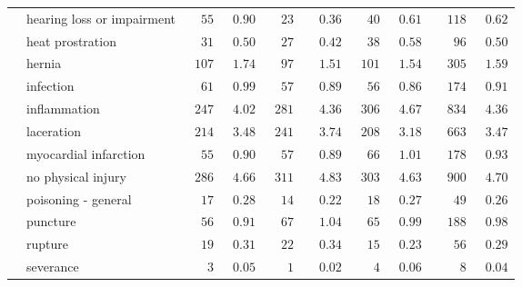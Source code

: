 \documentclass[9pt, oneside]{article}   	%
\begin{document}
\begin{longtable}{p{1.8in}p{2.2in}cccccccc}
 & hearing loss or impairment  & $\phantom{00}55$ & $\phantom{0}0.90$ & $\phantom{00}23$ & $\phantom{00}0.36$ & $\phantom{00}40$ & $\phantom{0}0.61$ & $\phantom{00}118$ & $\phantom{0}0.62$ \\
 & heat prostration  & $\phantom{00}31$ & $\phantom{0}0.50$ & $\phantom{00}27$ & $\phantom{00}0.42$ & $\phantom{00}38$ & $\phantom{0}0.58$ & $\phantom{000}96$ & $\phantom{0}0.50$ \\
 & hernia  & $\phantom{0}107$ & $\phantom{0}1.74$ & $\phantom{00}97$ & $\phantom{00}1.51$ & $\phantom{0}101$ & $\phantom{0}1.54$ & $\phantom{00}305$ & $\phantom{0}1.59$ \\
 & infection  & $\phantom{00}61$ & $\phantom{0}0.99$ & $\phantom{00}57$ & $\phantom{00}0.89$ & $\phantom{00}56$ & $\phantom{0}0.86$ & $\phantom{00}174$ & $\phantom{0}0.91$ \\
 & inflammation  & $\phantom{0}247$ & $\phantom{0}4.02$ & $\phantom{0}281$ & $\phantom{00}4.36$ & $\phantom{0}306$ & $\phantom{0}4.67$ & $\phantom{00}834$ & $\phantom{0}4.36$ \\
 & laceration  & $\phantom{0}214$ & $\phantom{0}3.48$ & $\phantom{0}241$ & $\phantom{00}3.74$ & $\phantom{0}208$ & $\phantom{0}3.18$ & $\phantom{00}663$ & $\phantom{0}3.47$ \\
 & myocardial infarction  & $\phantom{00}55$ & $\phantom{0}0.90$ & $\phantom{00}57$ & $\phantom{00}0.89$ & $\phantom{00}66$ & $\phantom{0}1.01$ & $\phantom{00}178$ & $\phantom{0}0.93$ \\
 & no physical injury  & $\phantom{0}286$ & $\phantom{0}4.66$ & $\phantom{0}311$ & $\phantom{00}4.83$ & $\phantom{0}303$ & $\phantom{0}4.63$ & $\phantom{00}900$ & $\phantom{0}4.70$ \\
 & poisoning - general  & $\phantom{00}17$ & $\phantom{0}0.28$ & $\phantom{00}14$ & $\phantom{00}0.22$ & $\phantom{00}18$ & $\phantom{0}0.27$ & $\phantom{000}49$ & $\phantom{0}0.26$ \\
 & puncture  & $\phantom{00}56$ & $\phantom{0}0.91$ & $\phantom{00}67$ & $\phantom{00}1.04$ & $\phantom{00}65$ & $\phantom{0}0.99$ & $\phantom{00}188$ & $\phantom{0}0.98$ \\
 & rupture  & $\phantom{00}19$ & $\phantom{0}0.31$ & $\phantom{00}22$ & $\phantom{00}0.34$ & $\phantom{00}15$ & $\phantom{0}0.23$ & $\phantom{000}56$ & $\phantom{0}0.29$ \\
 & severance  & $\phantom{000}3$ & $\phantom{0}0.05$ & $\phantom{000}1$ & $\phantom{00}0.02$ & $\phantom{000}4$ & $\phantom{0}0.06$ & $\phantom{0000}8$ & $\phantom{0}0.04$ \\

\end{longtable}
\end{document}
